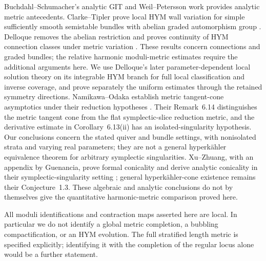 Buchdahl--Schumacher's analytic GIT and Weil--Petersson work
\cite{BS21,BS23,BS26} provides analytic metric antecedents.
Clarke--Tipler prove local HYM wall variation for simple sufficiently
smooth semistable bundles with abelian graded automorphism group
\cite[Proposition~1.1 and Theorem~1.2]{CT24}.
Delloque removes the abelian restriction and proves continuity of
HYM connection classes under metric variation
\cite[Theorems~4.8--4.9]{DelCont25}.
These results concern connections and graded bundles; the relative
harmonic moduli-metric estimates require the additional arguments here.
We use Delloque's later parameter-dependent local solution theory
\cite{Del25} on its integrable HYM branch for full local
classification and inverse coverage, and prove separately the
uniform estimates through the retained symmetry directions.
Namikawa--Odaka establish metric tangent-cone asymptotics under
their reduction hypotheses \cite[Setup~1, Proposition~6.10 and
Corollary~6.13]{NO26}. Their Remark~6.14 distinguishes
the metric tangent cone from the flat symplectic-slice reduction
metric, and the derivative estimate in Corollary~6.13(ii)
has an isolated-singularity hypothesis. Our conclusions concern
the stated quiver and bundle settings, with nonisolated strata
and varying real parameters; they are not a general hyperk\"ahler
equivalence theorem for arbitrary symplectic singularities.
Xu--Zhuang, with an appendix by Guenancia, prove formal conicality
and derive analytic conicality in their symplectic-singularity
setting \cite[Theorem~1.2 and Appendix~A]{XZ26}; general
hyperk\"ahler-cone existence remains their Conjecture~1.3.
These algebraic and analytic conclusions do not by themselves
give the quantitative harmonic-metric comparison proved here.

All moduli identifications and contraction maps asserted here
are local. In particular we do not identify a global metric
completion, a bubbling compactification, or an HYM evolution.
The full stratified length metric is specified explicitly;
identifying it with the completion of the regular locus alone
would be a further statement.

